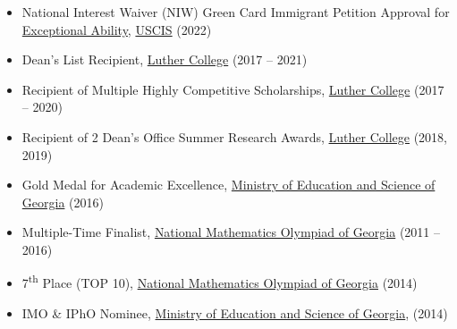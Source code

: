 \documentclass[a4paper]{article}
\newcommand{\entriesbegin}{\begin{itemize}[leftmargin=*]}
\newcommand{\entriesend}{\end{itemize}}
\newcommand{\entrysubitem}[1]{\item[\(\circ\)]\small{#1}\vspace{-4pt}}
\begin{document}
\entriesbegin
    \entrysubitem{National Interest Waiver (NIW) Green Card Immigrant Petition Approval for \href{https://www.uscis.gov/policy-manual/volume-6-part-f-chapter-5\#S-B}{Exceptional Ability}, \href{https://www.uscis.gov/}{USCIS} (2022)}
    \entrysubitem{Dean's List Recipient, \href{www.luther.edu}{Luther College} (2017 -- 2021)}
    \entrysubitem{Recipient of Multiple Highly Competitive Scholarships, \href{www.luther.edu}{Luther College} (2017 -- 2020)}
    \entrysubitem{Recipient of 2 Dean's Office Summer Research Awards, \href{www.luther.edu}{Luther College} (2018, 2019)}
    \entrysubitem{Gold Medal for Academic Excellence, \href{http://mes.gov.ge/?lang=eng}{Ministry of Education and Science of Georgia} (2016)}
    \entrysubitem{Multiple-Time Finalist, \href{https://naec.ge/}{National Mathematics Olympiad of Georgia} (2011 -- 2016)}
    \entrysubitem{7\textsuperscript{th} Place (TOP 10), \href{https://naec.ge/}{National Mathematics Olympiad of Georgia} (2014)}
    \entrysubitem{IMO \& IPhO Nominee, \href{http://mes.gov.ge/?lang=eng}{Ministry of Education and Science of Georgia}, (2014)}
\entriesend


\end{document}
